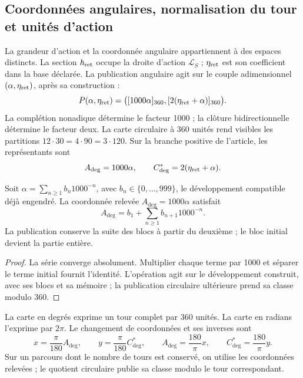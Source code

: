 \subsection{Coordonnées angulaires, normalisation du tour et unités d'action}
\label{ii:sec:ii-angulos}

La grandeur d'action et la coordonnée angulaire appartiennent à des espaces
distincts. La section \(\hbar_{\rm ret}\) occupe la droite d'action
\(\mathcal L_S\) ; \(\eta_{\rm ret}\) est son coefficient dans la base
déclarée. La publication angulaire agit sur le couple adimensionnel
\((\alpha,\eta_{\rm ret})\), après sa construction :
\begin{equation}
 \mathcal P(\alpha,\eta_{\rm ret})
 =\bigl([1000\alpha]_{360},[2(\eta_{\rm ret}+\alpha)]_{360}\bigr).
 \label{ii:eq:ii-par-angular}
\end{equation}
La complétion nonadique détermine le facteur 1000 ; la clôture
bidirectionnelle détermine le facteur deux. La carte circulaire à 360
unités rend visibles les partitions
\(12\cdot30=4\cdot90=3\cdot120\). Sur la branche positive de
l'article, les représentants sont
\[
 A_{\deg}=1000\alpha,\qquad
 C^*_{\deg}=2(\eta_{\rm ret}+\alpha).
\]

\begin{proposition}
\label{ii:prop:ii-desplazamiento-angular}
Soit \(\alpha=\sum_{n\geq1}b_n1000^{-n}\), avec
\(b_n\in\{0,\ldots,999\}\), le développement compatible déjà engendré.
La coordonnée relevée \(A_{\deg}=1000\alpha\) satisfait
\[
 A_{\deg}=b_1+\sum_{n\geq1}b_{n+1}1000^{-n}.
\]
La publication conserve la suite des blocs à partir du deuxième ;
le bloc initial devient la partie entière.
\end{proposition}
\begin{proof}
La série converge absolument. Multiplier chaque terme par 1000
et séparer le terme initial fournit l'identité. L'opération
agit sur le développement construit, avec ses blocs et sa mémoire ;
la publication circulaire ultérieure prend sa classe modulo 360.
\end{proof}

\begin{definition}
La carte en degrés exprime un tour complet par 360 unités.
La carte en radians l'exprime par \(2\pi\). Le changement de
coordonnées et ses inverses sont
\[
 x=\frac{\pi}{180}A_{\deg},\qquad
 y=\frac{\pi}{180}C^*_{\deg},\qquad
 A_{\deg}=\frac{180}{\pi}x,\qquad
 C^*_{\deg}=\frac{180}{\pi}y.
\]
Sur un parcours dont le nombre de tours est conservé, on utilise les
coordonnées relevées ; le quotient circulaire publie sa classe modulo
le tour correspondant.
\end{definition}

